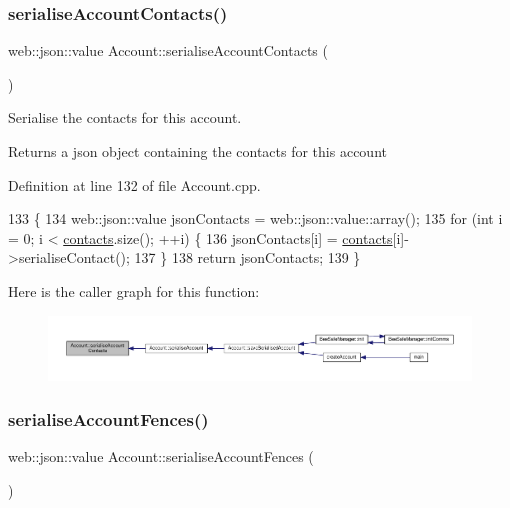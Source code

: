 \subsubsection{\texorpdfstring{serialise\+Account\+Contacts()}{serialiseAccountContacts()}}
{\footnotesize\ttfamily web\+::json\+::value Account\+::serialise\+Account\+Contacts (\begin{DoxyParamCaption}{ }\end{DoxyParamCaption})}

Serialise the contacts for this account.

\begin{DoxyReturn}{Returns}
a json object containing the contacts for this account 
\end{DoxyReturn}


Definition at line 132 of file Account.\+cpp.


\begin{DoxyCode}
133 \{
134     web::json::value jsonContacts = web::json::value::array();
135     \textcolor{keywordflow}{for} (\textcolor{keywordtype}{int} i = 0; i < \hyperlink{class_account_aa4f77abd7c44f2a70b0cff8088e3491f}{contacts}.size(); ++i) \{
136         jsonContacts[i] = \hyperlink{class_account_aa4f77abd7c44f2a70b0cff8088e3491f}{contacts}[i]->serialiseContact();
137     \}
138     \textcolor{keywordflow}{return} jsonContacts;
139 \}
\end{DoxyCode}
Here is the caller graph for this function\+:
\nopagebreak
\begin{figure}[H]
\begin{center}
\leavevmode
\includegraphics[width=350pt]{db/d22/class_account_a7f2d9836817ee851f723f6d3b1ff74a5_icgraph}
\end{center}
\end{figure}
\mbox{\label{class_account_a426837a406852a6e6b11eda85828fc58}} 
\subsubsection{\texorpdfstring{serialise\+Account\+Fences()}{serialiseAccountFences()}}
{\footnotesize\ttfamily web\+::json\+::value Account\+::serialise\+Account\+Fences (\begin{DoxyParamCaption}{ }\end{DoxyParamCaption})}

